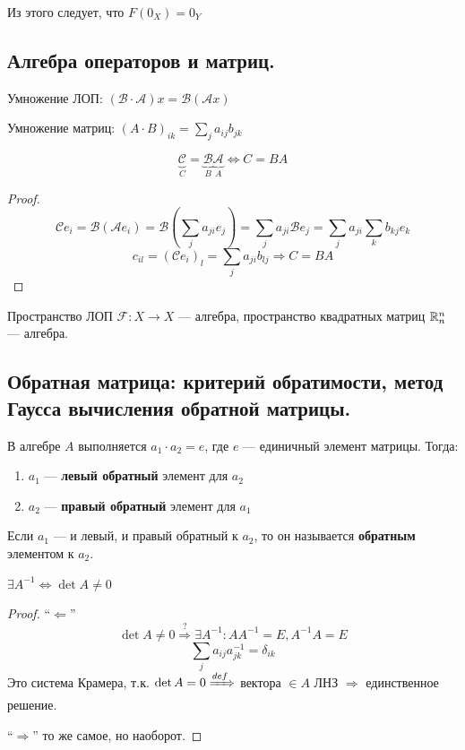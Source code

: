 Из этого следует, что $F(0_X)=0_Y$

\subsection{Алгебра операторов и матриц.}

Умножение ЛОП: $(\mathcal B \cdot \mathcal A)x = \mathcal B(\mathcal A x)$

Умножение матриц: $(A\cdot B)_{ik}=\sum\limits_{j} a_{ij}b_{jk}$

\begin{theorem}
    $$\underbrace{\mathcal C}_{C} = \underbrace{\mathcal B}_{B} \underbrace{\mathcal A}_{A} \Leftrightarrow C = BA$$
\end{theorem}
\begin{proof}
    $$\mathcal C e_i = \mathcal B(\mathcal A e_i) = \mathcal B\left(\sum_{j} a_{ji}e_j\right)=\sum_j a_{ji} \mathcal B e_j = \sum_j a_{ji} \sum_k b_{kj} e_k$$
    $$c_{il} = (\mathcal C e_i)_l = \sum_j a_{ji} b_{lj} \Rightarrow C = BA$$
\end{proof}

Пространство ЛОП $\mathcal F : X\to X$ --- алгебра, пространство квадратных матриц $\mathbb{R}_n^n$ --- алгебра.

\subsection{Обратная матрица: критерий обратимости, метод Гаусса вычисления обратной матрицы.}

В алгебре $A$ выполняется $a_1 \cdot a_2 = e$, где $e$ --- единичный элемент матрицы. Тогда:
\begin{enumerate}
    \item $a_1$ --- \textbf{левый обратный} элемент для $a_2$
    \item $a_2$ --- \textbf{правый обратный} элемент для $a_1$
\end{enumerate}

Если $a_1$ --- и левый, и правый обратный к $a_2$, то он называется \textbf{обратным} элементом к $a_2$.

\label{inversability}
\begin{theorem}
    $\exists A^{−1} \Leftrightarrow \det A \not= 0$
\end{theorem}
\begin{proof}
    ``$\Leftarrow$''
    $$\det A\not=0 \stackrel{?}{\Rightarrow} \exists A^{-1} : AA^{-1}=E, A^{-1}A=E$$
    $$\sum_j a_{ij}a^{-1}_{jk}=\delta_{ik}$$
    Это система Крамера, т.к. $\det A = 0 \xRightarrow{def}$ вектора $\in A$ ЛНЗ $\Rightarrow$ единственное решение.

    ``$\Rightarrow$'' то же самое, но наоборот. \yoba
\end{proof}

